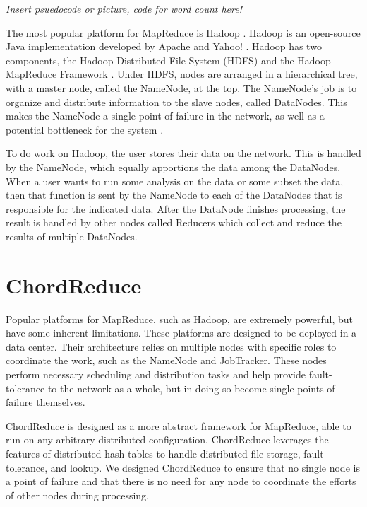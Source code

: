 \documentclass[10pt, conference, compsocconf]{IEEEtran}
\begin{document}
\textit{Insert psuedocode or picture, code for word count here!}


The most popular platform for MapReduce is Hadoop \cite{Hadoop}. Hadoop is an open-source Java implementation developed by Apache and Yahoo! \cite{pavlo2009comparison}.  Hadoop has two components, the Hadoop Distributed File System (HDFS) \cite{hdfs} and the Hadoop MapReduce Framework \cite{mrsurvey}.  Under HDFS, nodes are arranged in a hierarchical tree, with a master node, called the NameNode, at the top.  The NameNode's job is to organize and distribute information to the slave nodes, called DataNodes.  This makes the NameNode a single point of failure \cite{shvachko2010hadoop} in the network, as well as a potential bottleneck for the system \cite{hadoop-bottle}.

To do work on Hadoop, the user stores their data on the network.  This is handled by the NameNode, which equally apportions the data among the DataNodes.  When a user wants to run some analysis on the data or some subset the data, then that function is sent by the NameNode to each of the DataNodes that is responsible for the indicated data.   After the DataNode finishes processing, the result is handled by other nodes called Reducers which collect and reduce the results of multiple DataNodes.


\section{ChordReduce}

Popular platforms for MapReduce, such as Hadoop, are extremely powerful, but have some inherent limitations.  
These platforms are designed to be deployed in a data center.  
Their architecture relies on multiple nodes with specific roles to coordinate the work, such as the NameNode and JobTracker.
These nodes perform necessary scheduling and distribution tasks and help provide fault-tolerance to the network as a whole, but in doing so become single points of failure themselves.

ChordReduce is designed as a more abstract framework for MapReduce, able to run on any arbitrary distributed configuration.
ChordReduce leverages the features of distributed hash tables to handle distributed file storage, fault tolerance, and lookup.  We designed ChordReduce to ensure that no single node is a point of failure and that there is no need for any node to coordinate the efforts of other nodes during processing.  

\end{document}
